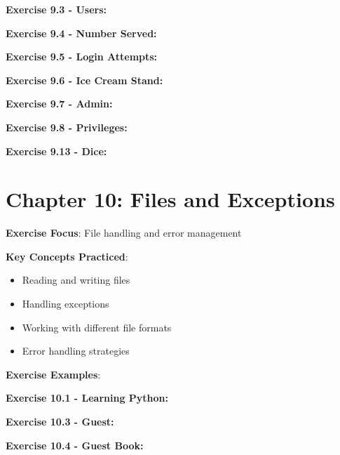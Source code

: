 \textbf{Exercise 9.3 - Users:}


\textbf{Exercise 9.4 - Number Served:}


\textbf{Exercise 9.5 - Login Attempts:}


\textbf{Exercise 9.6 - Ice Cream Stand:}


\textbf{Exercise 9.7 - Admin:}


\textbf{Exercise 9.8 - Privileges:}


\textbf{Exercise 9.13 - Dice:}


\section*{Chapter 10: Files and Exceptions}
\textbf{Exercise Focus}: File handling and error management

\textbf{Key Concepts Practiced}:
\begin{itemize}
    \item Reading and writing files
    \item Handling exceptions
    \item Working with different file formats
    \item Error handling strategies
\end{itemize}

\textbf{Exercise Examples}:

\textbf{Exercise 10.1 - Learning Python:}


\textbf{Exercise 10.3 - Guest:}


\textbf{Exercise 10.4 - Guest Book:}


